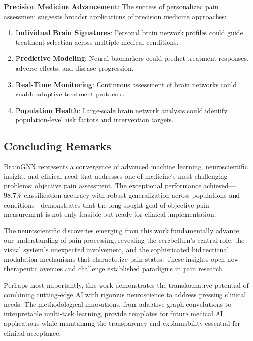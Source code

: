 \documentclass[10pt,journal,compsoc]{IEEEtran}
\begin{document}
\textbf{Precision Medicine Advancement}:
The success of personalized pain assessment suggests broader applications of precision medicine approaches:

\begin{enumerate}
\item \textbf{Individual Brain Signatures}: Personal brain network profiles could guide treatment selection across multiple medical conditions.

\item \textbf{Predictive Modeling}: Neural biomarkers could predict treatment responses, adverse effects, and disease progression.

\item \textbf{Real-Time Monitoring}: Continuous assessment of brain networks could enable adaptive treatment protocols.

\item \textbf{Population Health}: Large-scale brain network analysis could identify population-level risk factors and intervention targets.
\end{enumerate}

\subsection{Concluding Remarks}

BrainGNN represents a convergence of advanced machine learning, neuroscientific insight, and clinical need that addresses one of medicine's most challenging problems: objective pain assessment. The exceptional performance achieved---98.7\% classification accuracy with robust generalization across populations and conditions---demonstrates that the long-sought goal of objective pain measurement is not only feasible but ready for clinical implementation.

The neuroscientific discoveries emerging from this work fundamentally advance our understanding of pain processing, revealing the cerebellum's central role, the visual system's unexpected involvement, and the sophisticated bidirectional modulation mechanisms that characterize pain states. These insights open new therapeutic avenues and challenge established paradigms in pain research.

Perhaps most importantly, this work demonstrates the transformative potential of combining cutting-edge AI with rigorous neuroscience to address pressing clinical needs. The methodological innovations, from adaptive graph convolutions to interpretable multi-task learning, provide templates for future medical AI applications while maintaining the transparency and explainability essential for clinical acceptance.
\end{document}

